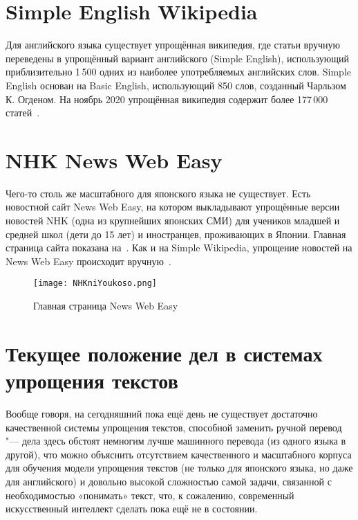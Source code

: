 \section{Simple English Wikipedia}


Для английского языка существует упрощённая википедия, где статьи вручную переведены в упрощённый вариант английского (Simple English), использующий приблизительно 1\,500 одних из наиболее употребляемых английских слов.
Simple English основан на Basic English, использующий 850 слов, созданный Чарльзом К. Огденом.
На ноябрь 2020 упрощённая википедия содержит более 177\,000 статей~\cite{SimpleWiki}.


\section{NHK News Web Easy}


Чего-то столь же масштабного для японского языка не существует.
Есть новостной сайт News Web Easy, на котором выкладывают упрощённые версии новостей NHK (одна из крупнейших японских СМИ) для учеников младшей и средней школ (дети до 15 лет) и иностранцев, проживающих в Японии.
Главная страница сайта показана на~.
Как и на Simple Wikipedia, упрощение новостей на News Web Easy происходит вручную~\cite{NHKnews}.
\begin{figure}[H]%
  \centering
  \texttt{[image: NHKniYoukoso.png]}
  \caption{Главная страница News Web Easy}
  \label{NHK}
\end{figure}


\section{Текущее положение дел в системах упрощения текстов}


Вообще говоря, на сегодняшний пока ещё день не существует достаточно качественной системы упрощения текстов, способной заменить ручной перевод "--- дела здесь обстоят немногим лучше машинного перевода (из одного языка в другой), что можно объяснить отсутствием качественного и масштабного корпуса для обучения модели упрощения текстов (не только для японского языка, но даже для английского) и довольно высокой сложностью самой задачи, связанной с необходимостью «понимать» текст, что, к сожалению, современный искусственный интеллект сделать пока ещё не в состоянии.

